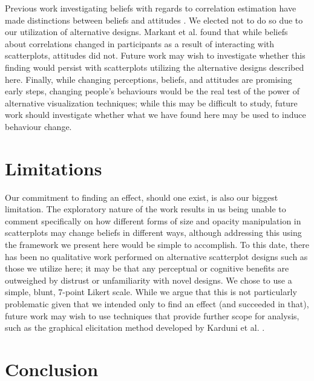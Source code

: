 \documentclass[manuscript,screen,review,anonymous]{acmart}
\begin{document}
Previous work investigating beliefs with regards to correlation
estimation have made distinctions between beliefs and attitudes
\citep{xiong_2022, markant_2023}. We elected not to do so due to our
utilization of alternative designs. Markant et al. \citep{markant_2023}
found that while beliefs about correlations changed in participants as a
result of interacting with scatterplots, attitudes did not. Future work
may wish to investigate whether this finding would persist with
scatterplots utilizing the alternative designs described here. Finally,
while changing perceptions, beliefs, and attitudes are promising early
steps, changing people's behaviours would be the real test of the power
of alternative visualization techniques; while this may be difficult to
study, future work should investigate whether what we have found here
may be used to induce behaviour change.

\section{Limitations}\label{sec-limitations}

Our commitment to finding an effect, should one exist, is also our
biggest limitation. The exploratory nature of the work results in us
being unable to comment specifically on how different forms of size and
opacity manipulation in scatterplots may change beliefs in different
ways, although addressing this using the framework we present here would
be simple to accomplish. To this date, there has been no qualitative
work performed on alternative scatterplot designs such as those we
utilize here; it may be that any perceptual or cognitive benefits are
outweighed by distrust or unfamiliarity with novel designs. We chose to
use a simple, blunt, 7-point Likert scale. While we argue that this is
not particularly problematic given that we intended only to find an
effect (and succeeded in that), future work may wish to use techniques
that provide further scope for analysis, such as the graphical
elicitation method developed by Karduni et al.
\citep{karduni_2021, karduni_2023}.

\section{Conclusion}\label{sec-conclusion}
\end{document}
